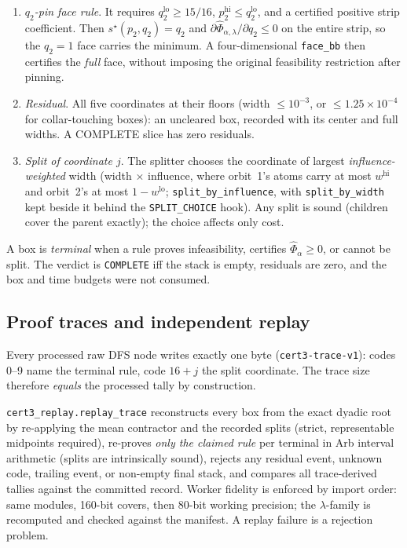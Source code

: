 \documentclass[11pt]{article}
\theoremstyle{plain}
\theoremstyle{definition}
\theoremstyle{remark}
\newcommand{\sstar}{s^{\star}}
\begin{document}
\begin{enumerate}
the full seven-value family is reserved for the face rule.  Block-mixed forms
handle a sink-touching vestigial orbit, followed by the orbit-swapped or
derivative-free weight-only forms on collar-touching boxes.
\item[\texttt{8}] \emph{$q_2$-pin face rule}. It requires
\(q_2^{\mathrm{lo}}\ge15/16\),
\(p_2^{\mathrm{hi}}\le q_2^{\mathrm{lo}}\), and a certified positive strip
coefficient.  Then \(\sstar(p_2,q_2)=q_2\) and
$\partial\widehat\Phi_{\alpha,\lambda}/\partial q_2\le0$ on the entire strip,
so the \(q_2=1\) face carries the minimum.  A four-dimensional
\texttt{face\_bb} then certifies the \emph{full} face, without imposing the
original feasibility restriction after pinning.
\item[\texttt{9}] \emph{Residual}. All five coordinates at their floors (width
$\le10^{-3}$, or $\le1.25\times10^{-4}$ for collar-touching boxes): an
uncleared box, recorded with its center and full widths. A COMPLETE slice has
zero residuals.
\item[\texttt{16+$j$}] \emph{Split of coordinate $j$}. The splitter chooses
the coordinate of largest \emph{influence-weighted} width (width $\times$
influence, where orbit~1's atoms carry at most $w^{\mathrm{hi}}$ and orbit~2's
at most $1-w^{\mathrm{lo}}$; \texttt{split\_by\_influence}, with
\texttt{split\_by\_width} kept beside it behind the \texttt{SPLIT\_CHOICE}
hook). Any split is sound (children cover the parent exactly); the choice affects
only cost.
\end{enumerate}

A box is \emph{terminal} when a rule proves infeasibility, certifies
$\widehat\Phi_\alpha\ge0$, or cannot be split. The verdict is \texttt{COMPLETE} iff the stack
is empty, residuals are zero, and the box and time budgets were not consumed.

\subsection{Proof traces and independent replay}
\label{sec:trace}
Every processed raw DFS node writes exactly one byte (\texttt{cert3-trace-v1}):
codes 0--9 name the terminal rule, code $16+j$ the split coordinate. The trace
size therefore \emph{equals} the processed tally by construction.

\texttt{cert3\_replay.replay\_trace} reconstructs every box from the exact dyadic
root by re-applying the mean contractor and the recorded splits (strict,
representable midpoints required), re-proves \emph{only the claimed rule} per
terminal in Arb interval arithmetic (splits are intrinsically sound), rejects any
residual event, unknown code, trailing event, or non-empty final stack, and
compares all trace-derived tallies against the committed record. Worker fidelity is
enforced by import order: same modules, 160-bit covers, then 80-bit working
precision; the $\lambda$-family is recomputed and checked against the manifest. A
replay failure is a rejection problem.
\end{document}
